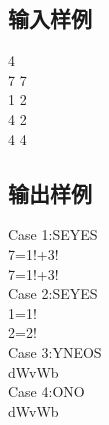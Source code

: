 \documentclass[12pt, a4paper]{article}
\begin{document}
\subsection*{输入样例}
4\\
7 7\\
1 2\\
4 2\\
4 4\\


\subsection*{输出样例}
Case 1:SEYES\\
7=1!+3!\\
7=1!+3!\\
Case 2:SEYES\\
1=1!\\
2=2!\\
Case 3:YNEOS\\
dWvWb\\
Case 4:ONO\\
dWvWb\\

\end{document}
